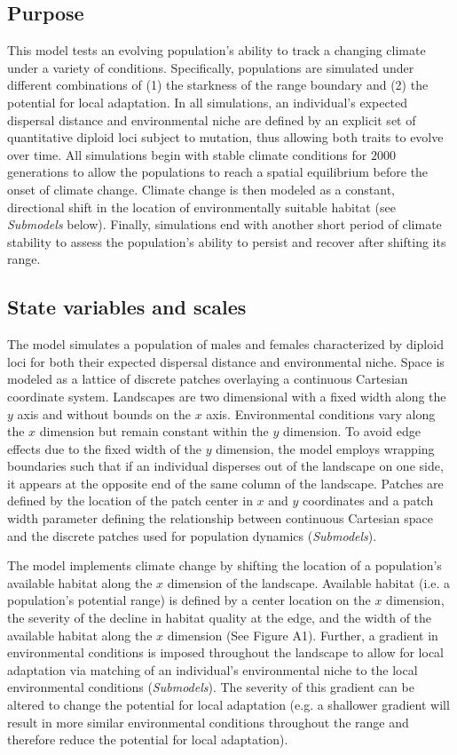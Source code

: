 \documentclass[11pt]{article}
\begin{document}
\subsection*{Purpose} 
This model tests an evolving population's ability to track a changing climate under a variety of conditions. Specifically, populations are simulated under different combinations of (1) the starkness of the range boundary and (2) the potential for local adaptation. In all simulations, an individual's expected dispersal distance and environmental niche are defined by an explicit set of quantitative diploid loci subject to mutation, thus allowing both traits to evolve over time. All simulations begin with stable climate conditions for $2000$ generations to allow the populations to reach a spatial equilibrium before the onset of climate change. Climate change is then modeled as a constant, directional shift in the location of environmentally suitable habitat (see \textit{Submodels} below). Finally, simulations end with another short period of climate stability to assess the population's ability to persist and recover after shifting its range.

\subsection*{State variables and scales} 
The model simulates a population of males and females characterized by diploid loci for both their expected dispersal distance and environmental niche. Space is modeled as a lattice of discrete patches overlaying a continuous Cartesian coordinate system. Landscapes are two dimensional with a fixed width along the $y$ axis and without bounds on the $x$ axis. Environmental conditions vary along the $x$ dimension but remain constant within the $y$ dimension. To avoid edge effects due to the fixed width of the $y$ dimension, the model employs wrapping boundaries such that if an individual disperses out of the landscape on one side, it appears at the opposite end of the same column of the landscape. Patches are defined by the location of the patch center in $x$ and $y$ coordinates and a patch width parameter defining the relationship between continuous Cartesian space and the discrete patches used for population dynamics (\textit{Submodels}). 

The model implements climate change by shifting the location of a population's available habitat along the $x$ dimension of the landscape. Available habitat (i.e. a population's potential range) is defined by a center location on the $x$ dimension, the severity of the decline in habitat quality at the edge, and the width of the available habitat along the $x$ dimension (See Figure A1). Further, a gradient in environmental conditions is imposed throughout the landscape to allow for local adaptation via matching of an individual's environmental niche to the local environmental conditions (\textit{Submodels}). The severity of this gradient can be altered to change the potential for local adaptation (e.g. a shallower gradient will result in more similar environmental conditions throughout the range and therefore reduce the potential for local adaptation).
\end{document}

